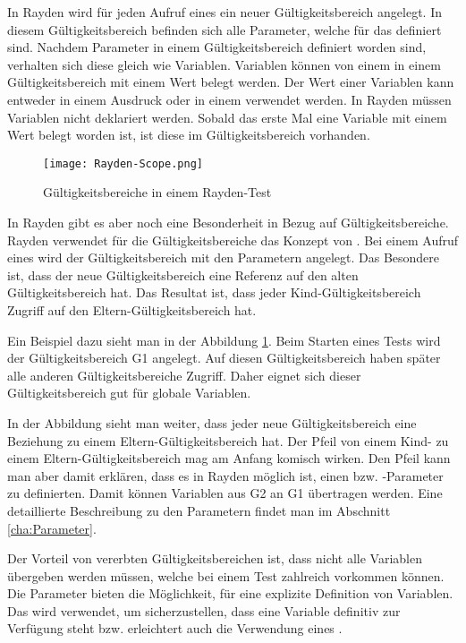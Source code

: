 In Rayden wird für jeden Aufruf eines  ein neuer Gültigkeitsbereich angelegt. In diesem Gültigkeitsbereich befinden sich alle Parameter, welche für das  definiert sind. Nachdem Parameter in einem Gültigkeitsbereich definiert worden sind, verhalten sich diese gleich wie Variablen. Variablen können von einem  in einem Gültigkeitsbereich mit einem Wert belegt werden. Der Wert einer Variablen kann entweder in einem Ausdruck oder in einem  verwendet werden. In Rayden müssen Variablen nicht deklariert werden. Sobald das erste Mal eine Variable mit einem Wert belegt worden ist, ist diese im Gültigkeitsbereich vorhanden.

\begin{figure}[h]
\centering
\texttt{[image: Rayden-Scope.png]}
\caption{Gültigkeitsbereiche in einem Rayden-Test}
\label{fig:rayden-scope}
\end{figure}

\SuperPar
In Rayden gibt es aber noch eine Besonderheit in Bezug auf Gültigkeitsbereiche. Rayden verwendet für die Gültigkeitsbereiche das Konzept von . Bei einem Aufruf eines  wird der Gültigkeitsbereich mit den Parametern angelegt. Das Besondere ist, dass der neue Gültigkeitsbereich eine Referenz auf den alten Gültigkeitsbereich hat. Das Resultat ist, dass jeder Kind-Gültigkeitsbereich Zugriff auf den Eltern-Gültigkeitsbereich hat.

\SuperPar
Ein Beispiel dazu sieht man in der Abbildung \ref{fig:rayden-scope}. Beim Starten eines Tests wird der Gültigkeitsbereich G1 angelegt. Auf diesen Gültigkeitsbereich haben später alle anderen Gültigkeitsbereiche Zugriff. Daher eignet sich dieser Gültigkeitsbereich gut für globale Variablen.

\SuperPar
In der Abbildung sieht man weiter, dass jeder neue Gültigkeitsbereich eine Beziehung zu einem Eltern-Gültigkeitsbereich hat. Der Pfeil von einem Kind- zu einem Eltern-Gültigkeitsbereich mag am Anfang komisch wirken. Den Pfeil kann man aber damit erklären, dass es in Rayden möglich ist, einen  bzw. -Parameter zu definierten. Damit können Variablen aus G2 an G1 übertragen werden. Eine detaillierte Beschreibung zu den Parametern findet man im Abschnitt \ref{cha:Parameter}.

\SuperPar
Der Vorteil von vererbten Gültigkeitsbereichen ist, dass nicht alle Variablen übergeben werden müssen, welche bei einem Test zahlreich vorkommen können. Die Parameter bieten die Möglichkeit, für eine explizite Definition von Variablen. Das wird verwendet, um sicherzustellen, dass eine Variable definitiv zur Verfügung steht bzw. erleichtert auch die Verwendung eines .

